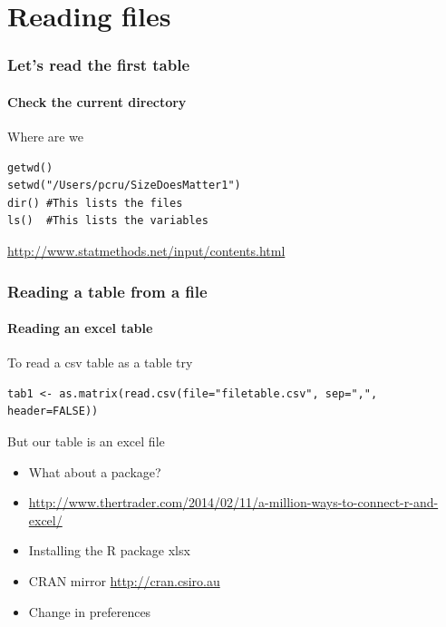 \documentclass[10pt,handout,english]{beamer}\usepackage[]{graphicx}\usepackage[]{color}
\begin{document}
\section*{Reading files}
\begin{frame}[fragile]
  \frametitle{Let's read the first table}
  \framesubtitle{Check the current directory}
\begin{block}{Where are we}
\begin{lstlisting} 
getwd()
setwd("/Users/pcru/SizeDoesMatter1")
dir() #This lists the files
ls()  #This lists the variables
\end{lstlisting}
\url{http://www.statmethods.net/input/contents.html}
\end{block}
\end{frame}

\begin{frame}[fragile]
  \frametitle{Reading a table from a file}
  \framesubtitle{Reading an excel table}
\begin{block}{To read a csv table as a table try}
\begin{lstlisting} 
tab1 <- as.matrix(read.csv(file="filetable.csv", sep=",", header=FALSE))
\end{lstlisting}
\end{block}
\begin{block}{But our table is an excel file}
\begin{itemize}
\item What about a package?
\item \url{http://www.thertrader.com/2014/02/11/a-million-ways-to-connect-r-and-excel/}
\item Installing the R package xlsx
\item CRAN mirror \url{http://cran.csiro.au}
\item Change in preferences
\end{itemize}
\end{block}
\end{frame}

\end{document}
